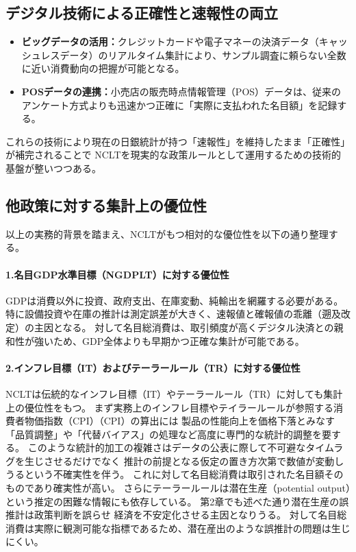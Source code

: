 \subsection{デジタル技術による正確性と速報性の両立}
\label{sec:discussion_practicality_digital}
\begin{itemize}
    \item\label{itm:discussion_practicality_digital_bigdata} \textbf{ビッグデータの活用：}クレジットカードや電子マネーの決済データ（キャッシュレスデータ）のリアルタイム集計により、サンプル調査に頼らない全数に近い消費動向の把握が可能となる。
    \item\label{itm:discussion_practicality_digital_pos} \textbf{POSデータの連携：}小売店の販売時点情報管理（POS）データは、従来のアンケート方式よりも迅速かつ正確に「実際に支払われた名目額」を記録する。
\end{itemize}
これらの技術により現在の日銀統計が持つ「速報性」を維持したまま「正確性」が補完されることで
NCLTを現実的な政策ルールとして運用するための技術的基盤が整いつつある。

\subsection{他政策に対する集計上の優位性}
\label{sec:discussion_practicality_advantage}
以上の実務的背景を踏まえ、NCLTがもつ相対的な優位性を以下の通り整理する。
\paragraph{1.名目GDP水準目標（NGDPLT）に対する優位性}\label{sec:discussion_practicality_advantage_ngdplt}
GDPは消費以外に投資、政府支出、在庫変動、純輸出を網羅する必要がある。
特に設備投資や在庫の推計は測定誤差が大きく、速報値と確報値の乖離（遡及改定）の主因となる。
対して名目総消費は、取引頻度が高くデジタル決済との親和性が強いため、GDP全体よりも早期かつ正確な集計が可能である。
\paragraph{2.インフレ目標（IT）およびテーラールール（TR）に対する優位性}\label{sec:discussion_practicality_advantage_it_tr}
NCLTは伝統的なインフレ目標（IT）やテーラールール（TR）に対しても集計上の優位性をもつ。
まず実務上のインフレ目標やテイラールールが参照する消費者物価指数（CPI）（CPI）の算出には
製品の性能向上を価格下落とみなす「品質調整」や「代替バイアス」の処理など高度に専門的な統計的調整を要する。
このような統計的加工の複雑さはデータの公表に際して不可避なタイムラグを生じさせるだけでなく
推計の前提となる仮定の置き方次第で数値が変動しうるという不確実性を伴う。
これに対して名目総消費は取引された名目額そのものであり確実性が高い。
さらにテーラールールは潜在生産（potential output）という推定の困難な情報にも依存している。
第2章でも述べた通り潜在生産の誤推計は政策判断を誤らせ
経済を不安定化させる主因となりうる\parencite{Orphanides2003,BeckworthHendrickson2019}。
対して名目総消費は実際に観測可能な指標であるため、潜在産出のような誤推計の問題は生じにくい。

